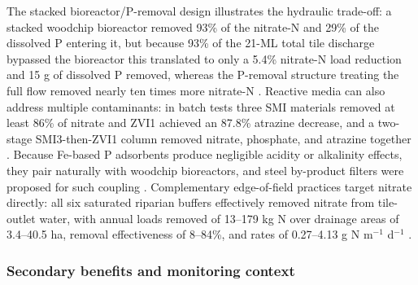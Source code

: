\documentclass[11pt]{article}
\begin{document}
The stacked bioreactor/P-removal design illustrates the hydraulic trade-off: a stacked woodchip bioreactor removed 93\% of the nitrate-N and 29\% of the dissolved P entering it, but because 93\% of the 21-ML total tile discharge bypassed the bioreactor this translated to only a 5.4\% nitrate-N load reduction and 15 g of dissolved P removed, whereas the P-removal structure treating the full flow removed nearly ten times more nitrate-N \parencite{Penn2024}. Reactive media can also address multiple contaminants: in batch tests three SMI materials removed at least 86\% of nitrate and ZVI1 achieved an 87.8\% atrazine decrease, and a two-stage SMI3-then-ZVI1 column removed nitrate, phosphate, and atrazine together \parencite{Allred2012}. Because Fe-based P adsorbents produce negligible acidity or alkalinity effects, they pair naturally with woodchip bioreactors, and steel by-product filters were proposed for such coupling \parencite{Sellner2019b}. Complementary edge-of-field practices target nitrate directly: all six saturated riparian buffers effectively removed nitrate from tile-outlet water, with annual loads removed of 13--179 kg N over drainage areas of 3.4--40.5 ha, removal effectiveness of 8--84\%, and rates of 0.27--4.13 g N m$^{-1}$ d$^{-1}$ \parencite{Jaynes2019}.

\subsubsection{Secondary benefits and monitoring context}
\end{document}
